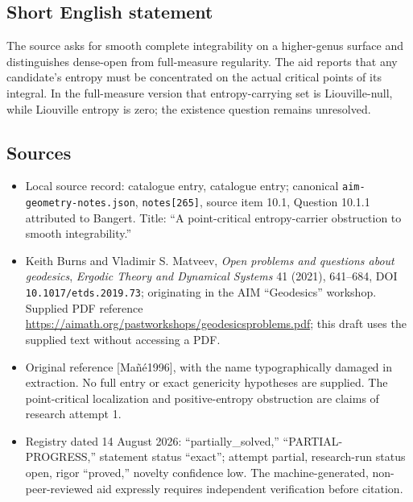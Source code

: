 \documentclass[11pt]{article}
\begin{document}
\subsection{Short English statement}
The source asks for smooth complete integrability on a higher-genus surface and distinguishes dense-open from full-measure regularity. The aid reports that any candidate's entropy must be concentrated on the actual critical points of its integral. In the full-measure version that entropy-carrying set is Liouville-null, while Liouville entropy is zero; the existence question remains unresolved.
\subsection{Sources}
\begin{itemize}
\item Local source record: catalogue entry, catalogue entry; canonical \texttt{aim-geometry-notes.json}, \texttt{notes[265]}, source item 10.1, Question 10.1.1 attributed to Bangert. Title: ``A point-critical entropy-carrier obstruction to smooth integrability.''
\item Keith Burns and Vladimir S. Matveev, \emph{Open problems and questions about geodesics}, \emph{Ergodic Theory and Dynamical Systems} 41 (2021), 641--684, DOI \texttt{10.1017/etds.2019.73}; originating in the AIM ``Geodesics'' workshop. Supplied PDF reference \url{https://aimath.org/pastworkshops/geodesicsproblems.pdf}; this draft uses the supplied text without accessing a PDF.
\item Original reference [Ma\~n\'e1996], with the name typographically damaged in extraction. No full entry or exact genericity hypotheses are supplied. The point-critical localization and positive-entropy obstruction are claims of research attempt 1.
\item Registry dated 14 August 2026: ``partially\_solved,'' ``PARTIAL-PROGRESS,'' statement status ``exact''; attempt partial, research-run status open, rigor ``proved,'' novelty confidence low. The machine-generated, non-peer-reviewed aid expressly requires independent verification before citation.
\end{itemize}
\end{document}
